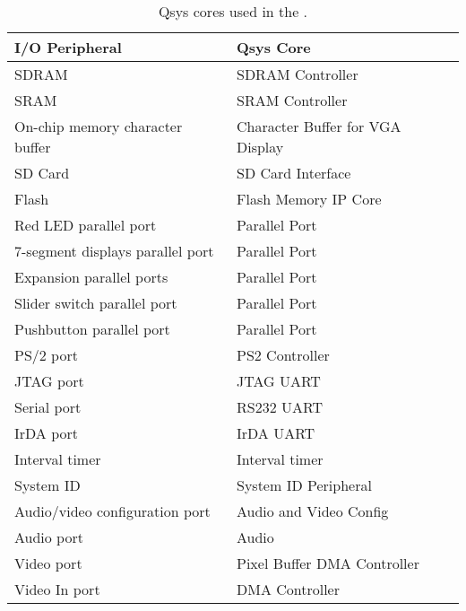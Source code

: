 
\begin{table}[h]
    \begin{center}
    \begin{tabular}{l|l}
            \textbf{I/O Peripheral}
            & \textbf{Qsys Core}
        \\\hline
            SDRAM
            & SDRAM Controller
        \\
            SRAM
        &   SRAM Controller
        \\
            On-chip memory character buffer
				& Character Buffer for VGA Display
        \\
            SD Card
        &   SD Card Interface
        \\
            Flash
        &   Flash Memory IP Core
        \\
            Red LED parallel port
				& Parallel Port
        \\
            7-segment displays parallel port
				& Parallel Port
        \\
            Expansion parallel ports
				& Parallel Port
        \\
            Slider switch parallel port
				& Parallel Port
        \\
            Pushbutton parallel port
				& Parallel Port
        \\
            PS/2 port
				& PS2 Controller
        \\
            JTAG port
				& JTAG UART
        \\
            Serial port
				& RS232 UART
        \\
            IrDA port
				& IrDA UART
        \\
            Interval timer
				& Interval timer 
        \\
            System ID
				& System ID Peripheral
        \\
            Audio/video configuration port
				& Audio and Video Config
        \\
            Audio port
				& Audio
        \\
            Video port
				& Pixel Buffer DMA Controller
        \\
            Video In port
				& DMA Controller
        \\
    \end{tabular}
    \caption{Qsys cores used in the \systemName.}
    \label{tab:sopcnames}
    \end{center}
\end{table}
\clearpage

